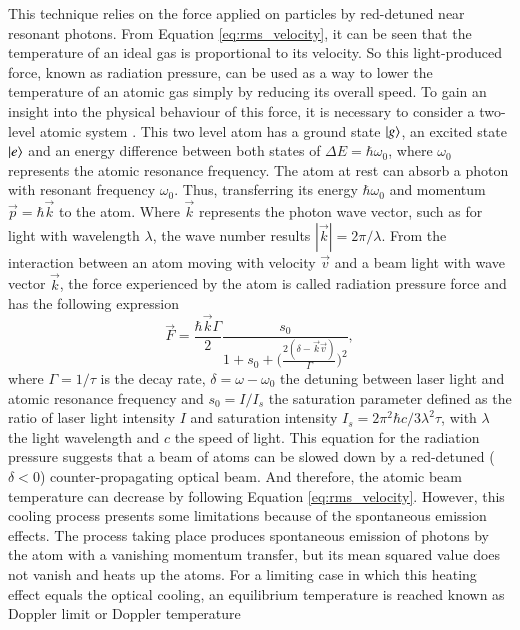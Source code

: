 This technique relies on the force applied on particles by red-detuned near resonant photons. From Equation \eqref{eq:rms_velocity}, it can be seen that the temperature of an ideal gas is proportional to its velocity. So this light-produced force, known as radiation pressure, can be used as a way to lower the temperature of an atomic gas simply by reducing its overall speed. To gain an insight into the physical behaviour of this force, it is necessary to consider a two-level atomic system \cite{Metcalf1999}. This two level atom has a ground state $\ket{g}$, an excited state $\ket{e}$ and an energy difference between both states of $\Delta E = \hbar \omega_0$, where $\omega_0$ represents the atomic resonance frequency. The atom at rest can absorb a photon with resonant frequency $\omega_0$. Thus, transferring its energy $\hbar \omega_0$ and momentum $\vec{p}= \hbar \vec{k}$ to the atom. Where $\vec{k}$ represents the photon wave vector, such as for light with wavelength $\lambda$, the wave number results $|\vec{k}| = 2 \pi / \lambda$. From the interaction between an atom moving with velocity $\vec{v}$ and a beam light with wave vector $\vec{k}$, the force experienced by the atom is called radiation pressure force and has the following expression \cite{Metcalf1999}
\begin{equation}\label{eq:radiation_pressure}
	\vec{F} = \frac{\hbar \vec{k} \Gamma}{2} \frac{s_0}{1 + s_0 + \Big(\frac{2(\delta-\vec{k}\vec{v})}{\Gamma}\Big)^2},
\end{equation}
where $\Gamma = 1/\tau$ is the decay rate, $\delta = \omega - \omega_0$ the detuning between laser light and atomic resonance  frequency and $s_0 = I / I_s$ the saturation parameter defined as the ratio of laser light intensity $I$ and saturation intensity $I_s = 2 \pi^2 \hbar c/ 3 \lambda^2 \tau$, with $\lambda$ the light wavelength and $c$ the speed of light. This equation for the radiation pressure suggests that a beam of atoms can be slowed down by a red-detuned ($\delta < 0$) counter-propagating optical beam. And therefore, the atomic beam temperature can decrease by following Equation \eqref{eq:rms_velocity}. However, this cooling process presents some limitations because of the spontaneous emission effects. The process taking place produces spontaneous emission of photons by the atom with a vanishing momentum transfer, but its mean squared value does not vanish and heats up the atoms. For a limiting case in which this heating effect equals the optical cooling, an equilibrium temperature is reached known as Doppler limit or Doppler temperature 
